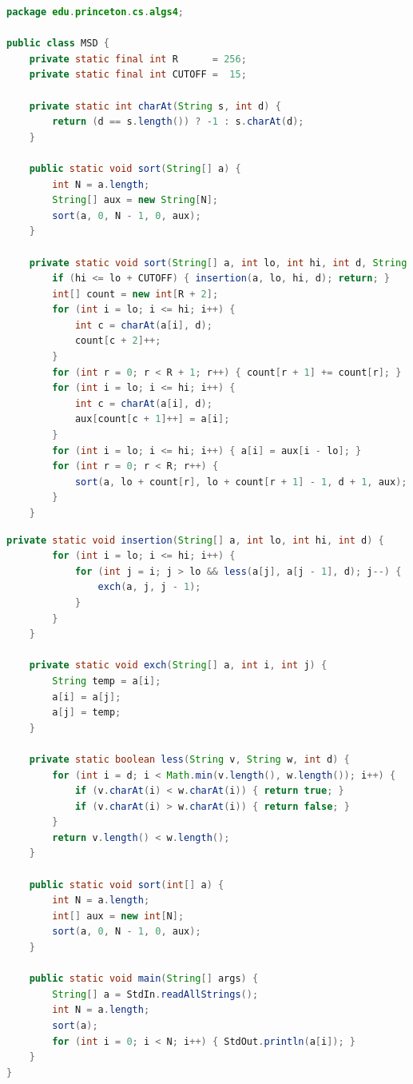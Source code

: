 \documentclass[8pt,a4paper,compress]{beamer}
\begin{document}
\begin{frame}[fragile]
\pause

\begin{lstlisting}[language=Java]
package edu.princeton.cs.algs4;

public class MSD {
    private static final int R      = 256; 
    private static final int CUTOFF =  15; 
    
    private static int charAt(String s, int d) {
        return (d == s.length()) ? -1 : s.charAt(d);
    }

    public static void sort(String[] a) {
        int N = a.length;
        String[] aux = new String[N];
        sort(a, 0, N - 1, 0, aux);
    }

    private static void sort(String[] a, int lo, int hi, int d, String[] aux) {
        if (hi <= lo + CUTOFF) { insertion(a, lo, hi, d); return; }
        int[] count = new int[R + 2];
        for (int i = lo; i <= hi; i++) {
            int c = charAt(a[i], d);
            count[c + 2]++;
        }
        for (int r = 0; r < R + 1; r++) { count[r + 1] += count[r]; }
        for (int i = lo; i <= hi; i++) {
            int c = charAt(a[i], d);
            aux[count[c + 1]++] = a[i];
        }
        for (int i = lo; i <= hi; i++) { a[i] = aux[i - lo]; }
        for (int r = 0; r < R; r++) {
            sort(a, lo + count[r], lo + count[r + 1] - 1, d + 1, aux);
        }
    }
\end{lstlisting}
\end{frame}

\begin{frame}[fragile]
\pause

\begin{lstlisting}[language=Java]
    private static void insertion(String[] a, int lo, int hi, int d) {
        for (int i = lo; i <= hi; i++) {
            for (int j = i; j > lo && less(a[j], a[j - 1], d); j--) {
                exch(a, j, j - 1);
            }
        }
    }

    private static void exch(String[] a, int i, int j) {
        String temp = a[i];
        a[i] = a[j];
        a[j] = temp;
    }

    private static boolean less(String v, String w, int d) {
        for (int i = d; i < Math.min(v.length(), w.length()); i++) {
            if (v.charAt(i) < w.charAt(i)) { return true; }
            if (v.charAt(i) > w.charAt(i)) { return false; }
        }
        return v.length() < w.length();
    }

    public static void sort(int[] a) {
        int N = a.length;
        int[] aux = new int[N];
        sort(a, 0, N - 1, 0, aux);
    }

    public static void main(String[] args) {
        String[] a = StdIn.readAllStrings();
        int N = a.length;
        sort(a);
        for (int i = 0; i < N; i++) { StdOut.println(a[i]); }
    }
}
\end{lstlisting}
\end{frame}
\end{document}
